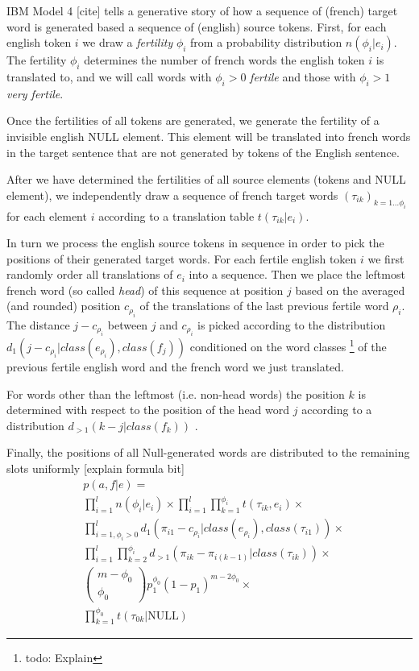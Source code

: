 IBM Model 4 {[}cite{]} tells a generative story of how a sequence
of (french) target word is generated based a sequence of (english)
source tokens. First, for each english token $i$ we draw a \emph{fertility}
$\phi_{i}$ from a probability distribution $n\left(\phi_{i}|e_{i}\right)$.
The fertility $\phi_{i}$ determines the number of french words the
english token $i$ is translated to, and we will call words with $\phi_{i}>0$
\emph{fertile} and those with $\phi_{i}>1$ \emph{very fertile}. 

Once the fertilities of all tokens are generated, we generate the
fertility of a invisible english NULL element. This element will be
translated into french words in the target sentence that are not generated
by tokens of the English sentence. 

After we have determined the fertilities of all source elements (tokens
and NULL element), we independently draw a sequence of french target
words $\left(\tau_{ik}\right)_{k=1\ldots\phi_{i}}$ for each element
$i$ according to a translation table $t\left(\tau_{ik}|e_{i}\right)$. 

In turn we process the english source tokens in sequence in order
to pick the positions of their generated target words. For each fertile
english token $i$ we first randomly order all translations of $e_{i}$
into a sequence. Then we place the leftmost french word (so called
\emph{head}) of this sequence at position $j$ based on the averaged
(and rounded) position $c_{\rho_{i}}$ of the translations of the
last previous fertile word $\rho_{i}$. The distance $j-c_{\rho_{i}}$
between $j$ and $c_{\rho_{i}}$ is picked according to the distribution
$d_{1}\left(j-c_{\rho_{i}}|class\left(e_{\rho_{i}}\right),class\left(f_{j}\right)\right)$
conditioned on the word classes%
\footnote{todo: Explain%
} of the previous fertile english word and the french word we just
translated. 

For words other than the leftmost (i.e. non-head words) the position
$k$ is determined with respect to the position of the head word $j$
according to a distribution $d_{>1}\left(k-j|class\left(f_{k}\right)\right)$
.

Finally, the positions of all Null-generated words are distributed
to the remaining slots uniformly {[}explain formula bit{]}
\begin{eqnarray*}
 & p\left(a,f|e\right)=\\
 & \prod_{i=1}^{l}n\left(\phi_{i}|e_{i}\right)\times\prod_{i=1}^{l}\prod_{k=1}^{\phi_{i}}t\left(\tau_{ik},e_{i}\right)\times\\
 & \prod_{i=1,\phi_{i}>0}^{l}d_{1}\left(\pi_{i1}-c_{\rho_{i}}|class\left(e_{\rho_{i}}\right),class\left(\tau_{i1}\right)\right)\times\\
 & \prod_{i=1}^{l}\prod_{k=2}^{\phi_{i}}d_{>1}\left(\pi_{ik}-\pi_{i\left(k-1\right)}|class\left(\tau_{ik}\right)\right)\times\\
 & \left(\begin{array}{c}
m-\phi_{0}\\
\phi_{0}\end{array}\right)p_{1}^{\phi_{0}}\left(1-p_{1}\right)^{m-2\phi_{0}}\times\\
 & \prod_{k=1}^{\phi_{0}}t\left(\tau_{0k}|\text{NULL}\right)\end{eqnarray*}
